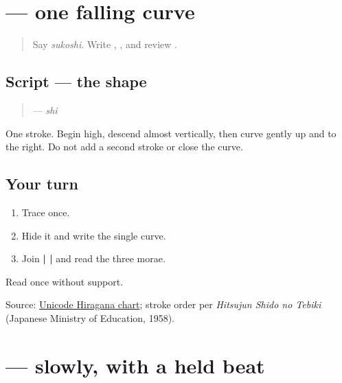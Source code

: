 \section[\texorpdfstring{\ja{し} (shi)}{し (shi)}]{ — one falling curve}

\label{lesson:JA-W10-shi}



\begin{quote}
Say \emph{sukoshi}. Write \textbf{}, \textbf{}, and review \textbf{}.
\end{quote}

\subsection*{Script — the shape}

\begin{quote}
\textbf{} — \emph{shi}
\end{quote}

One stroke. Begin high, descend almost vertically, then curve gently up and to the right. Do not add a second stroke or close the curve.

\subsection*{Your turn}
\begin{enumerate}
\raggedright
  \item Trace \textbf{} once.
  \item Hide it and write the single curve.
  \item Join \textbf{ |  | } and read the three morae.
\end{enumerate}

\begin{tcolorbox}[breakable,colback=teal!4,colframe=teal!35!black,title={Before you move on}]
Read \textbf{} once without support.

Source: \href{https://www.unicode.org/charts/PDF/U3040.pdf}{Unicode Hiragana chart}; stroke order per \emph{Hitsujun Shido no Tebiki} (Japanese Ministry of Education, 1958).
\end{tcolorbox}
\section[\texorpdfstring{\ja{ゆっくり} (yukkuri)}{ゆっくり (yukkuri)}]{ — slowly, with a held beat}

